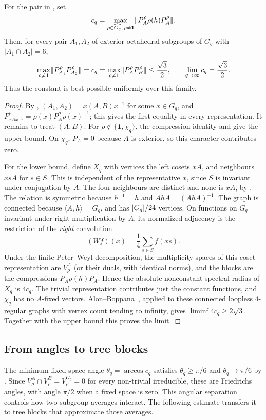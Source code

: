 \begin{theorem}
\label{thm:octahedral-sharp}
For the pair in , set
\[
 c_q=\max_{\rho\in\widehat{G_q},\,\rho\ne\mathbf1}
          \lVert P_A^\rho\rho(h)P_A^\rho \rVert.
\]
Then, for every pair $A_1,A_2$ of exterior octahedral subgroups of $G_q$
with $|A_1\cap A_2|=6$,
\[
 \max_{\rho\ne\mathbf1}\lVert P_{A_1}^\rho P_{A_2}^\rho \rVert
 =c_q=\max_{\rho\ne\mathbf1}\lVert P_A^\rho P_B^\rho \rVert\le\frac{\sqrt3}{2},
 \qquad
 \lim_{q\to\infty}c_q
       =\frac{\sqrt3}{2}.
\]
Thus the constant is best possible uniformly over this family.
\end{theorem}
\begin{proof}
By , $(A_1,A_2)=x(A,B)x^{-1}$ for some
$x\in G_q$, and $P_{xAx^{-1}}^\rho=\rho(x)P_A^\rho\rho(x)^{-1}$; this
gives the first equality in every representation. It remains to treat
$(A,B)$. For $\rho\notin\{\mathbf1,\chi_q\}$, the compression identity and
 give the upper bound. On $\chi_q$,
$P_A=0$ because $A$ is exterior, so this character contributes zero.

For the lower bound, define $X_q$ with vertices the left cosets $xA$,
and neighbours $xsA$ for $s\in S$. This is independent of the
representative $x$, since $S$ is invariant under conjugation by $A$.
The four neighbours are distinct and none is $xA$, by
. The relation is symmetric because
$h^{-1}=h$ and $AhA=(AhA)^{-1}$. The graph is connected because
$\langle A,h\rangle=G_q$, and has $\lvert G_q \rvert/24$ vertices.
On functions on $G_q$ invariant under right multiplication by $A$,
its normalized adjacency is the restriction of the \emph{right}
convolution
\[
 (Wf)(x)=\frac14\sum_{s\in S}f(xs).
\]
Under the finite Peter--Weyl decomposition, the multiplicity spaces of
this coset representation are $V_\rho^A$ (or their duals, with identical
norms), and the blocks are the compressions
$P_A\rho(h)P_A$. Hence the absolute nonconstant spectral radius of
$X_q$ is $4c_q$. The trivial representation contributes just the
constant functions, and $\chi_q$ has no $A$-fixed vectors.
Alon--Boppana~\cite[Theorem 1.3.1]{DSV2003}, applied to these connected
loopless $4$-regular graphs with vertex count tending to infinity,
gives $\liminf 4c_q\ge2\sqrt3$. Together with the upper bound this
proves the limit.
\end{proof}

\subsection{From angles to tree blocks}
The minimum fixed-space angle $\theta_q=\arccos c_q$ satisfies
$\theta_q\ge\pi/6$ and $\theta_q\to\pi/6$ by
. Since
$V_\rho^A\cap V_\rho^B=V_\rho^{G_q}=0$ for every non-trivial irreducible,
these are Friedrichs angles, with angle $\pi/2$ when a fixed space is zero.
This angular separation controls how two subgroup averages interact.
The following estimate transfers it to tree blocks that
approximate those averages.

